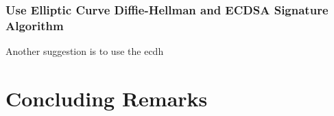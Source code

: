 \subsubsection{Use Elliptic Curve Diffie-Hellman and ECDSA Signature Algorithm}

Another suggestion is to use the \gls{ecdh}


\section{Concluding Remarks}


